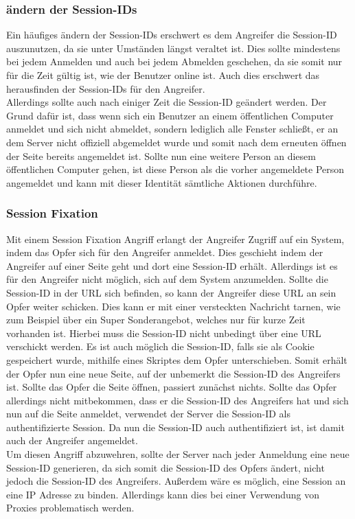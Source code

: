 \subsubsection{ändern der Session-IDs}
Ein häufiges ändern der Session-IDs erschwert es dem Angreifer die Session-ID auszunutzen, da sie unter Umständen längst veraltet ist. Dies sollte mindestens bei jedem Anmelden und auch bei jedem Abmelden geschehen, da sie somit nur für die Zeit gültig ist, wie der Benutzer online ist. Auch dies erschwert das herausfinden der Session-IDs für den Angreifer. \\
Allerdings sollte auch nach einiger Zeit die Session-ID geändert werden. Der Grund dafür ist, dass wenn sich ein Benutzer an einem öffentlichen Computer anmeldet und sich nicht abmeldet, sondern lediglich alle Fenster schließt, er an dem Server nicht offiziell abgemeldet wurde und somit nach dem erneuten öffnen der Seite bereits angemeldet ist. Sollte nun eine weitere Person an diesem öffentlichen Computer gehen, ist diese Person als die vorher angemeldete Person angemeldet und kann mit dieser Identität sämtliche Aktionen durchführe.
\subsubsection{Session Fixation}
Mit einem Session Fixation Angriff erlangt der Angreifer Zugriff auf ein System, indem das Opfer sich für den Angreifer anmeldet. Dies geschieht indem der Angreifer auf einer Seite geht und dort eine Session-ID erhält. Allerdings ist es für den Angreifer nicht möglich, sich auf dem System anzumelden. Sollte die Session-ID in der URL sich befinden, so kann der Angreifer diese URL an sein Opfer weiter schicken. Dies kann er mit einer versteckten Nachricht tarnen, wie zum Beispiel über ein Super Sonderangebot, welches nur für kurze Zeit vorhanden ist. Hierbei muss die Session-ID nicht unbedingt über eine URL verschickt werden. Es ist auch möglich die Session-ID, falls sie als Cookie gespeichert wurde, mithilfe eines Skriptes dem Opfer unterschieben. Somit erhält der Opfer nun eine neue Seite, auf der unbemerkt die Session-ID des Angreifers ist. Sollte das Opfer die Seite öffnen, passiert zunächst nichts. Sollte das Opfer allerdings nicht mitbekommen, dass er die Session-ID des Angreifers hat und sich nun auf die Seite anmeldet, verwendet der Server die Session-ID als authentifizierte Session. Da nun die Session-ID auch authentifiziert ist, ist damit auch der Angreifer angemeldet. \\
Um diesen Angriff abzuwehren, sollte der Server nach jeder Anmeldung eine neue Session-ID generieren, da sich somit die Session-ID des Opfers ändert, nicht jedoch die Session-ID des Angreifers. Außerdem wäre es möglich, eine Session an eine IP Adresse zu binden. Allerdings kann dies bei einer Verwendung von Proxies problematisch werden. 

